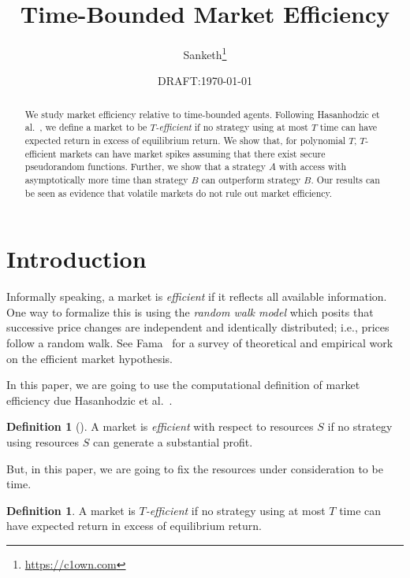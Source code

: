 \documentclass[11pt]{article}
\theoremstyle{definition}
\newtheorem{definition}[theorem]{Definition}
\begin{document}
\title{\bfseries Time-Bounded Market Efficiency}
\author{%
    Sanketh\thanks{%
        \url{https://c1own.com}%
    }
}
\date{DRAFT:\;\today}
\maketitle

\begin{abstract}
    We study market efficiency relative to time-bounded agents.  Following
    Hasanhodzic et al.~\cite{HasanhodzicLV11}, we define a market to be
    \emph{$T$-efficient} if no strategy using at most $T$ time can have expected
    return in excess of equilibrium return. We show that, for polynomial $T$,
    $T$-efficient markets can have market spikes assuming that there exist
    secure pseudorandom functions. Further, we show that a strategy $A$ with
    access with asymptotically more time than strategy $B$ can outperform
    strategy $B$. Our results can be seen as evidence that volatile markets do
    not rule out market efficiency.
\end{abstract}

\section{Introduction}

Informally speaking, a market is \emph{efficient} if it reflects all available
information. One way to formalize this is using the \emph{random walk model}
which posits that successive price changes are independent and identically
distributed; i.e., prices follow a random walk. See Fama~\cite{Fama70} for a
survey of theoretical and empirical work on the efficient market hypothesis.

In this paper, we are going to use the computational definition of market
efficiency due Hasanhodzic et al.~\cite{HasanhodzicLV11}.

\begin{definition}[\cite{HasanhodzicLV11}]
    A market is \emph{efficient} with respect to resources $S$ if no strategy
    using resources $S$ can generate a substantial profit.
\end{definition}

But, in this paper, we are going to fix the resources under consideration to be time.

\begin{definition}
    A market is \emph{$T$-efficient} if no strategy using at most $T$ time can
    have expected return in excess of equilibrium return. 
\end{definition}
\end{document}
